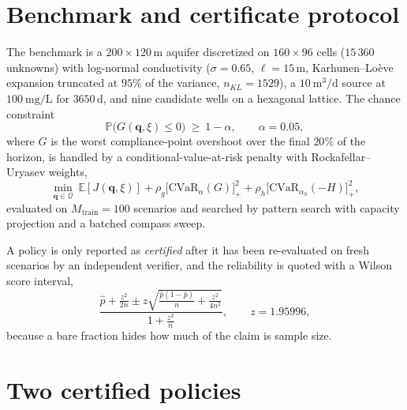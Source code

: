 
\label{sec:results-2d}
\section{Benchmark and certificate protocol}

The benchmark is a $200\times120$\,m aquifer discretized on $160\times96$ cells
($15\,360$ unknowns) with log-normal conductivity ($\sigma=0.65$, $\ell=15$\,m,
Karhunen--Lo\`eve expansion truncated at $95\%$ of the variance, $n_{KL}=1529$),
a $10\ \mathrm{m^3/d}$ source at $100\ \mathrm{mg/L}$ for $3650$\,d, and nine
candidate wells on a hexagonal lattice.  The chance constraint
\begin{equation}
  \mathbb{P}\bigl(G(\mathbf{q},\xi)\le 0\bigr)\ \ge\ 1-\alpha ,
  \qquad \alpha = 0.05 ,
\end{equation}
where $G$ is the worst compliance-point overshoot over the final $20\%$ of the
horizon, is handled by a conditional-value-at-risk penalty with Rockafellar--Uryasev
weights,
\begin{equation}
  \min_{\mathbf{q}\in\mathcal{Q}}\ \mathbb{E}[J(\mathbf{q},\xi)]
  + \rho_g\bigl[\mathrm{CVaR}_{\alpha}(G)\bigr]_+^2
  + \rho_h\bigl[\mathrm{CVaR}_{\alpha_h}(-H)\bigr]_+^2 ,
\end{equation}
evaluated on $M_{\text{train}}=100$ scenarios and searched by pattern search with
capacity projection and a batched compass sweep.

A policy is only reported as \emph{certified} after it has been re-evaluated on
fresh scenarios by an independent verifier, and the reliability is quoted with a
Wilson score interval,
\begin{equation}
  \frac{\hat p + \frac{z^2}{2n} \pm z\sqrt{\frac{\hat p(1-\hat p)}{n}+\frac{z^2}{4n^2}}}
       {1+\frac{z^2}{n}} ,
  \qquad z = 1.95996 ,
\end{equation}
because a bare fraction hides how much of the claim is sample size.

\section{Two certified policies}

